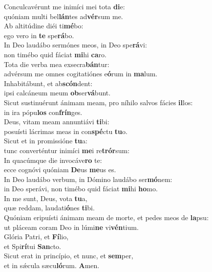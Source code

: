 \evenverse Conculcavérunt me inimíci mei tota \textbf{di}e:~\*\\
\evenverse quóniam multi bel\textbf{lán}tes ad\textbf{vér}sum me.\\
\oddverse Ab altitúdine diéi ti\textbf{mé}bo:~\*\\
\oddverse ego vero in \textbf{te} spe\textbf{rá}bo.\\
\evenverse In Deo laudábo sermónes meos, in Deo spe\textbf{rá}vi:~\*\\
\evenverse non timébo quid fáciat \textbf{mi}hi \textbf{ca}ro.\\
\oddverse Tota die verba mea exsecra\textbf{bán}tur:~\*\\
\oddverse advérsum me omnes cogitatiónes e\textbf{ó}rum in \textbf{ma}lum.\\
\evenverse Inhabitábunt, et ab\textbf{scón}dent:~\*\\
\evenverse ipsi calcáneum meum \textbf{ob}ser\textbf{vá}bunt.\\
\oddverse Sicut sustinuérunt ánimam meam, pro níhilo salvos fácies \textbf{il}los:~\*\\
\oddverse in ira pópu\textbf{los} con\textbf{frín}ges.\\
\evenverse Deus, vitam meam annuntiávi \textbf{ti}bi:~\*\\
\evenverse posuísti lácrimas meas in con\textbf{spé}ctu \textbf{tu}o.\\
\oddverse Sicut et in promissióne \textbf{tu}a:~\*\\
\oddverse tunc converténtur inimíci \textbf{me}i re\textbf{trór}sum:\\
\evenverse In quacúmque die invocáve\textbf{ro} te:~\*\\
\evenverse ecce cognóvi quóniam \textbf{De}us \textbf{me}us es.\\
\oddverse In Deo laudábo verbum, in Dómino laudábo ser\textbf{mó}nem:~\*\\
\oddverse in Deo sperávi, non timébo quid fáciat \textbf{mi}hi \textbf{ho}mo.\\
\evenverse In me sunt, Deus, vota \textbf{tu}a,~\*\\
\evenverse quæ reddam, laudati\textbf{ó}nes \textbf{ti}bi.\\
\oddverse Quóniam eripuísti ánimam meam de morte, et pedes meos de \textbf{la}psu:~\*\\
\oddverse ut pláceam coram Deo in lúmi\textbf{ne} vi\textbf{vén}tium.\\
\evenverse Glória Patri, et \textbf{Fí}lio,~\*\\
\evenverse et Spi\textbf{rí}tui \textbf{San}cto.\\
\oddverse Sicut erat in princípio, et nunc, et \textbf{sem}per,~\*\\
\oddverse et in sǽcula sæcu\textbf{ló}rum. \textbf{A}men.\\

